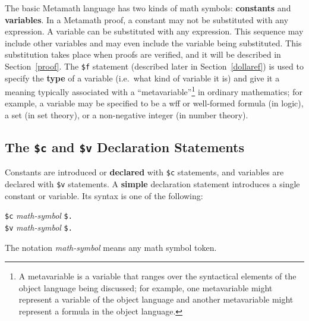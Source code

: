 The basic Metamath language has two
kinds of math symbols:  {\bf constants} and
{\bf variables}.  In a Metamath proof, a constant may not be
substituted with any expression.  A variable can be
substituted with any
expression.  This sequence may include other variables and may even include
the variable being substituted.  This substitution takes place when proofs are
verified, and it will be described in Section~\ref{proof}.  The \texttt{\$f}
statement (described later in Section~\ref{dollaref}) is used to specify the
{\bf type} of a variable (i.e.\ what kind of
variable it is) and
give it a meaning typically
associated with a ``metavariable''\footnote{A metavariable
is a variable that ranges over the syntactical elements of the object language
being discussed; for example, one metavariable might represent a variable of
the object language and another metavariable might represent a formula in the
object language.} in ordinary mathematics; for example, a variable may be
specified to be a wff or well-formed formula (in logic), a set (in set
theory), or a non-negative integer (in number theory).

\subsection{The \texttt{\$c} and \texttt{\$v} Declaration Statements}

Constants are introduced or {\bf declared}
with \texttt{\$c} statements, and
variables are declared with
\texttt{\$v} statements.  A {\bf simple}
declaration statement introduces a single
constant or variable.  Its syntax is one of the following:
\begin{center}
  \texttt{\$c} {\em math-symbol} \texttt{\$.}\\
  \texttt{\$v} {\em math-symbol} \texttt{\$.}
\end{center}
The notation {\em math-symbol} means any math symbol token.

